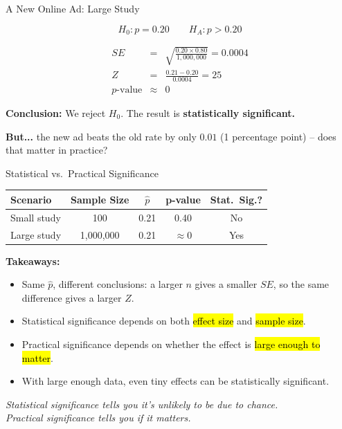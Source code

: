 \documentclass[slidestop,compress,mathserif]{beamer}
\begin{document}
\begin{frame}{A New Online Ad: Large Study}
\footnotesize
{}

\pause
\vspace{-2mm}
\[ H_0: p = 0.20 \qquad H_A: p > 0.20 \]

\pause
\begin{eqnarray*}
SE &=& \sqrt{\frac{0.20 \times 0.80}{1{,}000{,}000}} = 0.0004 \\
Z &=& \frac{0.21 - 0.20}{0.0004} = 25 \\
p\text{-value} &\approx& 0
\end{eqnarray*}

\pause
\textbf{Conclusion:} We reject \(H_0\). The result is \textbf{statistically significant.}

\medskip
\textbf{But...} the new ad beats the old rate by only \(\mathbf{0.01}\) (1 percentage point) --
does that matter in practice?
\end{frame}


\begin{frame}{Statistical vs.\ Practical Significance}
\footnotesize
\begin{center}
\begin{tabular}{lcccc}
\textbf{Scenario} & \textbf{Sample Size} & \(\hat{p}\) & \textbf{p-value} & \textbf{Stat.\ Sig.?} \\
\hline
Small study & 100 & 0.21 & 0.40 & No \\
Large study & 1{,}000{,}000 & 0.21 & \(\approx 0\) & Yes \\
\end{tabular}
\end{center}

\medskip
\textbf{Takeaways:}
\begin{itemize}
  \item Same \(\hat{p}\), different conclusions: a larger \(n\) gives a smaller \(SE\), so the same difference gives a larger \(Z\).
  \item Statistical significance depends on both \hl{effect size} and \hl{sample size}.
  \item Practical significance depends on whether the effect is \hl{large enough to matter}.
  \item With large enough data, even tiny effects can be statistically significant.
\end{itemize}

\medskip
\textit{Statistical significance tells you it's unlikely to be due to chance.  \\
Practical significance tells you if it matters.}
\end{frame}
\end{document}
